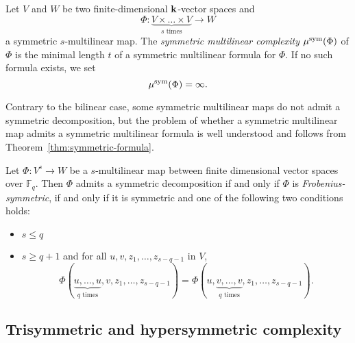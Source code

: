 \begin{defi}
Let $V$ and $W$ be two finite-dimensional $\mathbf{k}$-vector
spaces and
\[
  \Phi:\underset{\textrm{$s$ times}}{\underbrace{V\times\dots\times V}}\to W
\]
a symmetric $s$-multilinear map. The \emph{symmetric multilinear complexity} $\mu^{\textrm{sym}}(\Phi)$ of $\Phi$ is the
minimal length $t$ of a symmetric multilinear formula for $\Phi$. If no such
formula exists, we set
\[
  \mu^{\textrm{sym}}(\Phi) = \infty.
\]
\end{defi}
Contrary to the bilinear case, some symmetric multilinear maps do not admit a symmetric
decomposition, but the problem of whether a symmetric multilinear map admits
a symmetric multilinear formula is well understood and follows from
Theorem~\ref{thm:symmetric-formula}.
\begin{thm}\label{th:criterion}
\label{thm:symmetric-formula}
Let $\Phi:V^s\to W$ be a $s$-multilinear map between finite dimensional vector spaces over $\mathbb{F}_q$.
Then $\Phi$ admits a symmetric decomposition if and only if $\Phi$ is \emph{Frobenius-symmetric},
\ie if and only if it is symmetric and one of the following two conditions holds:
\begin{itemize}
\item $s\leq q$
\item $s\geq q+1$ and for all $u,v,z_1,\dots,z_{s-q-1}$ in $V$,
\[
\Phi(\underset{\textrm{$q$ times}}{\underbrace{u,\dots,u}},v,z_1,\dots,z_{s-q-1})=\Phi(u,\underset{\textrm{$q$ times}}{\underbrace{v,\dots,v}},z_1,\dots,z_{s-q-1}).
\]
\end{itemize}
\end{thm}

\subsection{Trisymmetric and hypersymmetric complexity}
\label{subsec:trisym}

